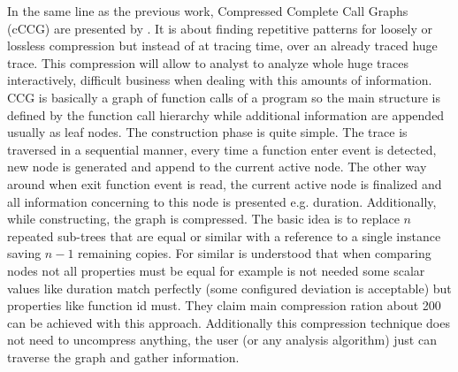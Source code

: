 \documentclass[10pt]{report}
\begin{document}
In the same line as the previous work, Compressed Complete Call Graphs (cCCG) are 
presented by \cite{knupfer2005construction}. It is about finding repetitive 
patterns for loosely or lossless compression but instead of at tracing time, 
over an already traced huge trace. 
This compression will allow to analyst to analyze whole huge traces 
interactively, difficult business when dealing with this amounts of information. 
CCG is basically a graph of function calls of a program so the main structure is
defined by the function call hierarchy while additional information are appended
usually as leaf nodes. The construction phase is quite simple. The trace is
traversed in a sequential manner, every time a function enter event is detected,
new node is generated and append to the current active node. The
other way around when exit function event is read, the current active node is
finalized and all information concerning to this node is presented e.g.
duration. Additionally, while constructing, the graph is compressed. The basic 
idea is to replace $n$ repeated sub-trees that are equal or similar with a 
reference to a single instance saving $n-1$ remaining copies. For similar is
understood that when comparing nodes not all properties must be equal for
example is not needed some scalar values like duration match perfectly (some
configured deviation is acceptable) but properties like function id must. They
claim main compression ration about 200 can be achieved with this approach.
Additionally this compression technique does not need to uncompress anything, the
user (or any analysis algorithm) just can traverse the graph and gather
information.
\end{document}
